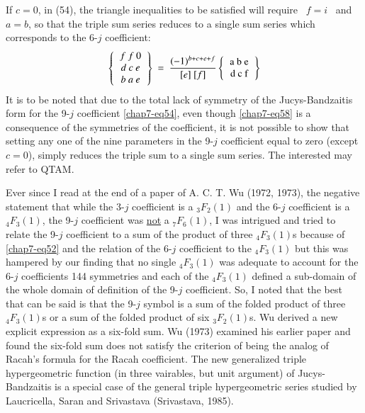 If $c=0$, in (54), the triangle inequalities to be satisfied will require \ $f=i$ \ and \ $a=b$, so that the triple sum series reduces to a single sum series which corresponds to the 6-$j$ coefficient:
\begin{equation}
\left\{
\begin{tabular}{c}
$f \ f \ 0$\\  
$d \ c\ e$\\ 
$b \ a \ e$\\ 
\end{tabular} 
\right\} \
=\ \frac{(-1)^{b+c+e+f}}{[e]\ [f]}
\left\{
\begin{tabular} {c} 
a\ b\ e\\ 
d\ c\ f \\ 
\end{tabular} 
\right\} \label{chap7-eq58}
\end{equation}
It is to be noted that due to the total lack of symmetry of the Jucys-Bandzaitis form for the 9-$j$ coefficient \eqref{chap7-eq54}, even though \eqref{chap7-eq58} is a consequence of the symmetries of the coefficient, it is not possible to show that setting any one of the nine parameters in the 9-$j$ coefficient equal to zero (except $c=0$), simply reduces the triple sum to a single sum series. The interested may refer to QTAM.

Ever since I read at the end of a paper of A. C. T. Wu (1972, 1973), the negative statement that while the 3-$j$ coefficient is a $_3F_2(1)$ and the 6-$j$ coefficient is a $_4F_3(1)$, the 9-$j$ coefficient was \underline{not} a $_7F_6(1)$, I was intrigued and tried to relate the 9-$j$ coefficient to a sum of the product of three $_4F_3(1)$s because of \eqref{chap7-eq52} and the relation of the 6-$j$ coefficient to the $_4F_3(1)$ but this was hampered by our finding that no single $_4F_3(1)$ was adequate to account for the 6-$j$ coefficients 144 symmetries and each of the $_4F_3(1)$ defined a sub-domain of the whole domain of definition of the  9-$j$ coefficient. So, I noted that the best that can be said is that the 9-$j$ symbol is a sum of the folded product of three $_4F_3(1)$s or a sum of the folded product of six $_3F_2(1)$s. Wu derived a new explicit expression as a six-fold sum. Wu (1973) examined his earlier paper and found the six-fold sum does not satisfy the criterion of being the analog of Racah's formula for the Racah coefficient. The new generalized triple hypergeometric function (in three vairables, but unit argument) of Jucys-Bandzaitis is a special case of the general triple hypergeometric series studied by Laucricella, Saran and Srivastava (Srivastava, 1985).

